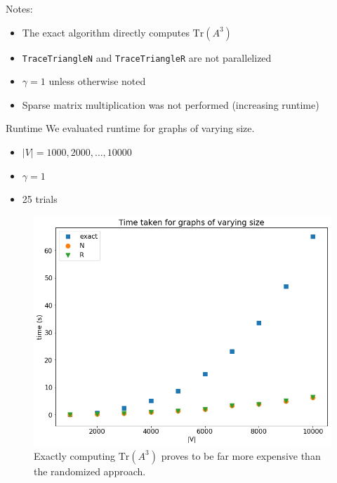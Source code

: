 \documentclass{beamer}
\begin{document}
\begin{frame}
    Notes:
    
    \begin{itemize}
        \item The exact algorithm directly computes $\textrm{Tr}(A^3)$
        \item \texttt{TraceTriangleN} and \texttt{TraceTriangleR} are not parallelized
        \item $\gamma = 1$ unless otherwise noted
        \item Sparse matrix multiplication was not performed (increasing runtime)
    \end{itemize}
\end{frame}

\begin{frame}{Runtime}
    We evaluated runtime for graphs of varying size.
    
    \begin{itemize}
        \item $|V| = 1000, 2000, \ldots, 10000$
        \item $\gamma = 1$
        \item 25 trials
    \end{itemize}
\end{frame}

\begin{frame}
    \begin{figure}
        \centering
        \includegraphics[width=0.7\linewidth]{figs/size-time.png}
        \caption{Exactly computing $\textrm{Tr}(A^3)$ proves to be far more expensive than the randomized approach.}
        \label{fig:size-time}
    \end{figure}
\end{frame}
\end{document}
